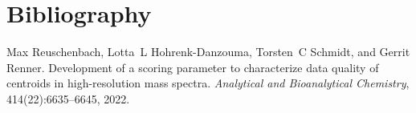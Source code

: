 \chapter{Bibliography}
\hypertarget{citelist}{}\label{citelist}

\begin{DoxyDescription}
\item[\label{citelist_CITEREF_reuschenbach2022development}%
\Hypertarget{citelist_CITEREF_reuschenbach2022development}%
\mbox{[}1\mbox{]}]Max Reuschenbach, Lotta~L Hohrenk-\/\+Danzouma, Torsten~C Schmidt, and Gerrit Renner. Development of a scoring parameter to characterize data quality of centroids in high-\/resolution mass spectra. {\itshape Analytical and Bioanalytical Chemistry}, 414(22)\+:6635--6645, 2022. 


\end{DoxyDescription}